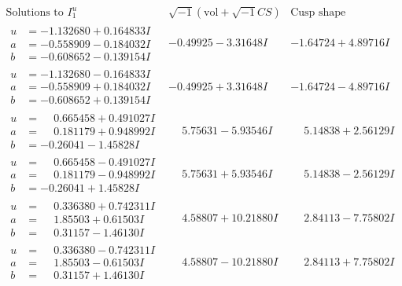 \documentclass[1p]{elsarticle_modified}
\theoremstyle{definition}
\newcommand{\I}{\sqrt{-1}}
\begin{document}
$$\begin{array}{c|c|c}  
\text{Solutions to }I^u_{1}& \I (\text{vol} + \sqrt{-1}CS) & \text{Cusp shape}\\
 \hline 
\begin{aligned}
u &= -1.132680 + 0.164833 I \\
a &= -0.558909 - 0.184032 I \\
b &= -0.608652 - 0.139154 I\end{aligned}
 & -0.49925 - 3.31648 I & -1.64724 + 4.89716 I \\ \hline\begin{aligned}
u &= -1.132680 - 0.164833 I \\
a &= -0.558909 + 0.184032 I \\
b &= -0.608652 + 0.139154 I\end{aligned}
 & -0.49925 + 3.31648 I & -1.64724 - 4.89716 I \\ \hline\begin{aligned}
u &= \phantom{-}0.665458 + 0.491027 I \\
a &= \phantom{-}0.181179 + 0.948992 I \\
b &= -0.26041 - 1.45828 I\end{aligned}
 & \phantom{-}5.75631 - 5.93546 I & \phantom{-}5.14838 + 2.56129 I \\ \hline\begin{aligned}
u &= \phantom{-}0.665458 - 0.491027 I \\
a &= \phantom{-}0.181179 - 0.948992 I \\
b &= -0.26041 + 1.45828 I\end{aligned}
 & \phantom{-}5.75631 + 5.93546 I & \phantom{-}5.14838 - 2.56129 I \\ \hline\begin{aligned}
u &= \phantom{-}0.336380 + 0.742311 I \\
a &= \phantom{-}1.85503 + 0.61503 I \\
b &= \phantom{-}0.31157 - 1.46130 I\end{aligned}
 & \phantom{-}4.58807 + 10.21880 I & \phantom{-}2.84113 - 7.75802 I \\ \hline\begin{aligned}
u &= \phantom{-}0.336380 - 0.742311 I \\
a &= \phantom{-}1.85503 - 0.61503 I \\
b &= \phantom{-}0.31157 + 1.46130 I\end{aligned}
 & \phantom{-}4.58807 - 10.21880 I & \phantom{-}2.84113 + 7.75802 I \\ \hline\begin{aligned}

\end{aligned}
\end{array}$$
\end{document}

